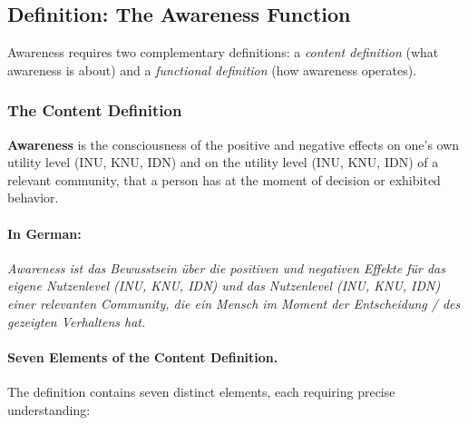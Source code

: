 \subsection{Definition: The Awareness Function}
\label{subsec:11-1-definition}


Awareness requires two complementary definitions: a \emph{content definition}
(what awareness is about) and a \emph{functional definition} (how awareness operates).

\subsubsection{The Content Definition}

\begin{definition}
\label{def:awareness-content}
\textbf{Awareness} is the consciousness of the positive and negative effects 
on one's own utility level (INU, KNU, IDN) and on the utility level (INU, KNU, IDN) 
of a relevant community, that a person has at the moment of decision or 
exhibited behavior.
\end{definition}

\paragraph{In German:}
\textit{Awareness ist das Bewusstsein über die positiven und negativen Effekte 
für das eigene Nutzenlevel (INU, KNU, IDN) und das Nutzenlevel (INU, KNU, IDN) 
einer relevanten Community, die ein Mensch im Moment der Entscheidung / 
des gezeigten Verhaltens hat.}

\paragraph{Seven Elements of the Content Definition.}
The definition contains seven distinct elements, each requiring precise understanding:

